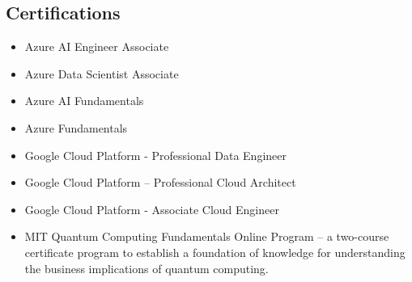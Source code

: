 \documentclass[10pt,a4paper,sans]{moderncv}        %
\begin{document}
\subsection{Certifications}
\begin{itemize}
\item Azure AI Engineer Associate
\item Azure Data Scientist Associate
\item Azure AI Fundamentals
\item Azure Fundamentals
\item Google Cloud Platform - Professional Data Engineer 
\item Google Cloud Platform – Professional Cloud Architect  
\item Google Cloud Platform - Associate Cloud Engineer 
\item MIT Quantum Computing Fundamentals Online Program – a two-course certificate program to establish a foundation of knowledge for understanding the business implications of quantum computing. 
\end{itemize}
\end{document}
